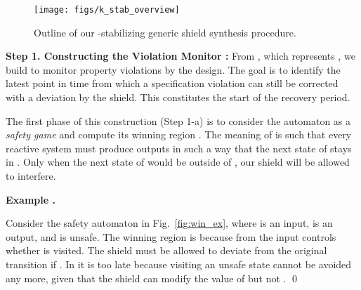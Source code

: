 \documentclass{llncs}
\newcounter{exacounter}
\newenvironment{exa}{
\refstepcounter{exacounter}
\smallskip\noindent
\textbf{Example \theexacounter.}
}{\vspace{2mm}}
\begin{document}
\begin{figure}[tb]
  \begin{center}
    \texttt{[image: figs/k\_stab\_overview]}
    \caption{Outline of our -stabilizing generic shield synthesis procedure.}
    \label{fig:k-stab}
  \end{center}
\end{figure}



\noindent
\textbf{Step 1. Constructing the Violation Monitor :}
From , which represents , we build 
 to monitor property 
violations by the design.  The goal is to identify the latest point in 
time from which a specification violation can still be corrected with a 
deviation by the shield.  This constitutes the start of the recovery 
period.

The first phase of this construction (Step 1-a) is to consider the 
automaton   as a 
\emph{safety game} and compute its winning region .  
The meaning of  is such that every reactive system 
 must produce outputs in such a 
way that the next state of  stays in .  Only when the 
next state of  would be outside of , our shield will 
be allowed to interfere.

\begin{exa}
Consider the safety automaton  in Fig.~\ref{fig:win_ex}, 
where  is an input,  is an output, and  is unsafe.  The 
winning region is  because from  the input  controls 
whether  is visited.  The shield must be allowed to deviate from 
the original transition  if . In  it 
is too late because visiting an unsafe state cannot be avoided any more, 
given that the shield can modify the value of  but not .  \qed
\end{exa}
\end{document}
